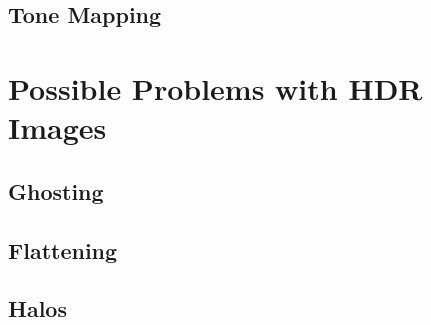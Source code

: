 \documentclass{article}
\begin{document}
\subsection{Tone Mapping}

\section{Possible Problems with HDR Images}
\subsection{Ghosting}
\subsection{Flattening}
\subsection{Halos}






\end{document}
